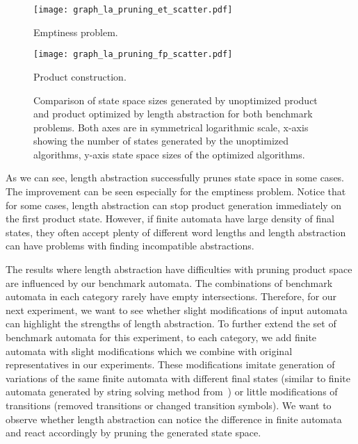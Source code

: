 \begin{figure*}[ht]
    \centering
    \begin{minipage}{0.49\linewidth}
        \centering
        \texttt{[image: graph\_la\_pruning\_et\_scatter.pdf]}
        \caption{Emptiness problem.}
        \label{fig:graph:et_pruning_state_space_sizes_comp}
    \end{minipage}
    \hfill
    \begin{minipage}{0.49\linewidth}
        \centering
        \texttt{[image: graph\_la\_pruning\_fp\_scatter.pdf]}
        \caption{Product construction.}
        \label{fig:graph:fp_pruning_state_space_sizes_comp}
    \end{minipage}
    \vspace{0.5cm}
    \caption{Comparison of state space sizes generated by unoptimized product and product optimized by length abstraction for both benchmark problems. Both axes are in symmetrical logarithmic scale\protect\footnotemark, x-axis showing the number of states generated by the unoptimized algorithms, y-axis state space sizes of the optimized algorithms.}
    \label{fig:graph:product_state_space_sizes}
\end{figure*}

As we can see, length abstraction successfully prunes state space in some cases. The improvement can be seen especially for the emptiness problem. Notice that for some cases, length abstraction can stop product generation immediately on the first product state. However, if finite automata have large density of final states, they often accept plenty of different word lengths and length abstraction can have problems with finding incompatible abstractions.

The results where length abstraction have difficulties with pruning product space are influenced by our benchmark automata. The combinations of benchmark automata in each category rarely have empty intersections. Therefore, for our next experiment, we want to see whether slight modifications of input automata can highlight the strengths of length abstraction. To further extend the set of benchmark automata for this experiment, to each category, we add finite automata with slight modifications which we combine with original representatives in our experiments. These modifications imitate generation of variations of the same finite automata with different final states (similar to finite automata generated by string solving method from~\cite{10.1007/978-3-319-08867-9_10}) or little modifications of transitions (removed transitions or changed transition symbols). We want to observe whether length abstraction can notice the difference in finite automata and react accordingly by pruning the generated state space.

